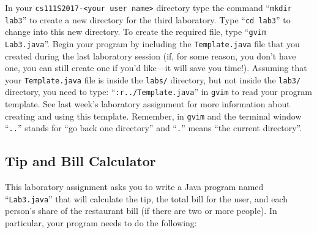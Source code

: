 In your {\tt cs111S2017-<your user name>} directory type the command ``{\tt mkdir lab3}'' to create a new directory for
the third laboratory.  \noindent Type ``{\tt cd lab3}'' to change into this new directory.  To create the required file,
type ``{\tt gvim Lab3.java}''. Begin your program by including the {\tt Template.java} file that you created during the
last laboratory session (if, for some reason, you don't have one, you can still create one if you'd like---it will
save you time!).  Assuming that your {\tt Template.java} file is inside the {\tt labs/} directory, but not
inside the {\tt lab3/} directory, you need to type: ``{\tt :r../Template.java}'' in {\tt gvim} to read your program
template.  See last week's laboratory assignment for more information about creating and using this template. Remember,
in {\tt gvim} and the terminal window ``{\tt ..}'' stands for ``go back one directory'' and ``{\tt .}'' means ``the
current directory''.

\vspace{-0.15in}
\subsection*{Tip and Bill Calculator}

This laboratory assignment asks you to write a Java program named ``{\tt Lab3.java}'' that will calculate the tip, the
total bill for the user, and each person's share of the restaurant bill (if there are two or more people). In
particular, your program needs to do the following:

